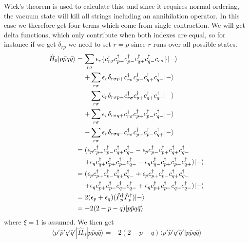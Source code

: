 \documentclass[norsk,a4paper,12pt]{article}
\begin{document}
Wick's theorem is used to calculate this, and since it requires normal ordering, the vacuum state will kill all strings including an annihilation operator. In this case we therefore get four terms which come from single contraction. We will get delta functions, which only contribute when both indexes are equal, so for instance if we get $\delta_{rp}$ we need to set $r=p$ since $r$ runs over all possible states.
\begin{align}
\hat{H}_0|p\bar{p}q\bar{q}\rangle 
&= \sum_{r\sigma}\epsilon_r\{c_{r\sigma}^{\dagger}c_{p+}^{\dagger}c_{p-}^{\dagger}c_{q+}^{\dagger}c_{q-}^{\dagger}c_{r\sigma}\}|-\rangle\notag\\
&\mathrel{\phantom{=}}+\sum_{r\sigma}\epsilon_r\delta_{r\sigma p+}c_{r\sigma}^{\dagger}c_{p-}^{\dagger}c_{q+}^{\dagger}c_{q-}^{\dagger}|-\rangle\notag\\
&\mathrel{\phantom{=}}-\sum_{r\sigma}\epsilon_r\delta_{r\sigma p-}c_{r\sigma}^{\dagger}c_{p+}^{\dagger}c_{q+}^{\dagger}c_{q-}^{\dagger}|-\rangle\notag\\
&\mathrel{\phantom{=}}+\sum_{r\sigma}\epsilon_r\delta_{r\sigma q+}c_{r\sigma}^{\dagger}c_{p+}^{\dagger}c_{p-}^{\dagger}c_{q-}^{\dagger}|-\rangle\notag\\
&\mathrel{\phantom{=}}-\sum_{r\sigma}\epsilon_r\delta_{r\sigma q-}c_{r\sigma}^{\dagger}c_{p+}^{\dagger}c_{p-}^{\dagger}c_{q+}^{\dagger}|-\rangle\notag\\
&=(\epsilon_pc_{p+}^{\dagger}c_{p-}^{\dagger}c_{q+}^{\dagger}c_{q-}^{\dagger}-\epsilon_pc_{p-}^{\dagger}c_{p+}^{\dagger}c_{q+}^{\dagger}c_{q-}^{\dagger}\notag\\
&\mathrel{\phantom{=}}+\epsilon_qc_{q+}^{\dagger}c_{p+}^{\dagger}c_{p-}^{\dagger}c_{q-}^{\dagger}-\epsilon_qc_{q-}^{\dagger}c_{p+}^{\dagger}c_{p-}^{\dagger}c_{q+}^{\dagger})|-\rangle\notag\\
&=(\epsilon_pc_{p+}^{\dagger}c_{p-}^{\dagger}c_{q+}^{\dagger}c_{q-}^{\dagger}+\epsilon_pc_{p+}^{\dagger}c_{p-}^{\dagger}c_{q+}^{\dagger}c_{q-}^{\dagger}\notag\\
&\mathrel{\phantom{=}}+\epsilon_qc_{p+}^{\dagger}c_{p-}^{\dagger}c_{q+}^{\dagger}c_{q-}^{\dagger}+\epsilon_qc_{p+}^{\dagger}c_{p-}^{\dagger}c_{q+}^{\dagger}c_{q-}^{\dagger})|-\rangle\notag\\
&=2(\epsilon_p+\epsilon_q)(\hat{P}_p^{\dagger}\hat{P}_p^{\dagger})|-\rangle\notag\\
&=-2(2-p-q)|p\bar{p}q\bar{q}\rangle
\end{align} 
where $\xi=1$ is assumed. We then get
\begin{equation}
\langle p'\bar{p}'q'\bar{q}'|\hat{H}_0|p\bar{p}q\bar{q}\rangle=-2(2-p-q)\langle p'\bar{p}'q'\bar{q}'|p\bar{p}q\bar{q}\rangle
\end{equation}
\end{document}
